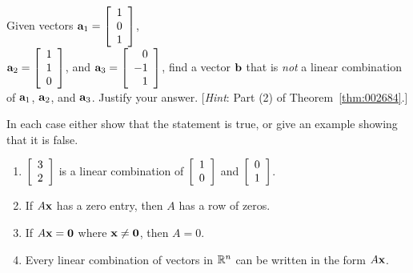 \begin{multicols}{2}
\begin{ex}
\begin{sol}
\begin{enumerate}[label={\alph*.}]
\end{enumerate}
\end{sol}
\end{ex}

\begin{ex}
Given vectors $\textbf{a}_{1} = \left[ \begin{array}{r}
1 \\
0 \\
1
\end{array} \right]$, \\$\textbf{a}_{2} = \left[ \begin{array}{r}
1 \\
1 \\
0
\end{array} \right]$, and $\textbf{a}_{3} = \left[ \begin{array}{r}
0 \\
-1 \\
1
\end{array} \right]$, find a vector $\textbf{b}$ that is \textit{not} a linear combination of $\textbf{a}_{1}$, $\textbf{a}_{2}$, and $\textbf{a}_{3}$. Justify your answer. [\textit{Hint}: Part (2) of Theorem~\ref{thm:002684}.]
\end{ex}

\begin{ex}
In each case either show that the statement is true, or give an example showing that it is false.


\begin{enumerate}[label={\alph*.}]
\item $\left[ \begin{array}{r}
3 \\
2
\end{array} \right]$
 is a linear combination of $\left[ \begin{array}{r}
 1 \\
 0
 \end{array} \right]$
 and $\left[ \begin{array}{r}
 0 \\
 1
 \end{array} \right]$.


\item If $A\textbf{x}$ has a zero entry, then $A$ has a row of zeros.

\item If $A\textbf{x} = \textbf{0}$ where $\textbf{x} \neq \textbf{0}$, then $A = 0$.

\item Every linear combination of vectors in $\mathbb{R}^n$ can be written in the form $A\textbf{x}$.


\end{enumerate}
\end{ex}
\end{multicols}
